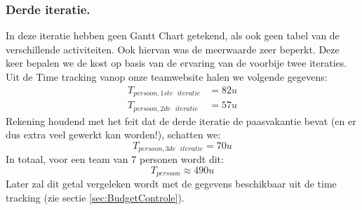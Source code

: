 \subsubsection{Derde iteratie.}
In deze iteratie hebben geen Gantt Chart getekend, als ook geen tabel van de verschillende activiteiten. Ook hiervan was de meerwaarde zeer beperkt. Deze keer bepalen we de kost op basis van de ervaring van de voorbije twee iteraties. Uit de Time tracking vanop onze teamwebsite halen we volgende gegevens:
\begin{eqnarray}
	T_{persoon, 1ste\text{ }iteratie} &= 82u \\
	T_{persoon, 2de\text{ }iteratie} &= 57u
\end{eqnarray}
Rekening houdend met het feit dat de derde iteratie de paasvakantie bevat (en er dus extra veel gewerkt kan worden!), schatten we:
\begin{equation*}
	T_{persoon, 3de\text{ }iteratie} = 70u
\end{equation*} 
In totaal, voor een team van 7 personen wordt dit:
\begin{equation*}
	T_{persoon} \approx 490u
\end{equation*}
Later zal dit getal vergeleken wordt met de gegevens beschikbaar uit de time tracking (zie sectie \ref{sec:BudgetControle}).
